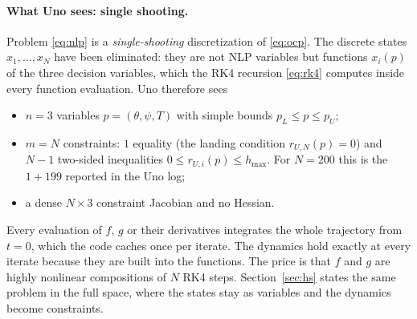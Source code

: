 \documentclass[11pt]{article}
\begin{document}
\paragraph{What Uno sees: single shooting.} Problem \eqref{eq:nlp} is a \emph{single-shooting}
discretization of \eqref{eq:ocp}. The discrete states $x_1,\dots,x_N$ have been eliminated: they are
not NLP variables but functions $x_i(p)$ of the three decision variables, which the RK4 recursion
\eqref{eq:rk4} computes inside every function evaluation. Uno therefore sees
\begin{itemize}
  \item $n = 3$ variables $p = (\theta,\psi,T)$ with simple bounds $p_L \le p \le p_U$;
  \item $m = N$ constraints: $1$ equality (the landing condition $r_{U,N}(p) = 0$) and $N-1$
        two-sided inequalities $0 \le r_{U,i}(p) \le h_{\max}$. For $N = 200$ this is the
        $1 + 199$ reported in the Uno log;
  \item a dense $N\times3$ constraint Jacobian and no Hessian.
\end{itemize}
Every evaluation of $f$, $g$ or their derivatives integrates the whole trajectory from $t=0$, which
the code caches once per iterate. The dynamics hold exactly at every iterate because they are
built into the functions. The price is that $f$ and $g$ are highly nonlinear compositions of $N$
RK4 steps. Section~\ref{sec:hs} states the same problem in the full space, where the states stay
as variables and the dynamics become constraints.
\end{document}
